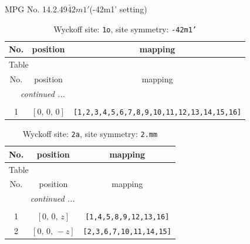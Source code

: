 \documentclass[fleqn,8pt]{jsarticle}
\begin{document}
\setcounter{MaxMatrixCols}{32}

\renewcommand{\tablename}{Table~}
\renewcommand{\figurename}{Figure~}
\begin{center}
\LARGE
MPG No. 14.2.49\quad$\bar{4}2m1'$\quad(-42m1' setting)
\end{center}
\renewcommand{\arraystretch}{1.2}
\begin{longtable}{ccc}
\caption{Wyckoff site: {\tt 1o}, site symmetry: {\tt -42m1'}}
 \\
 \hline \hline
No. & position & mapping \\ \hline \endfirsthead

\multicolumn{2}{l}{\tablename\ \thetable{}} \\
 \hline \hline
No. & position & mapping \\ \hline \endhead

 \hline \hline
\multicolumn{2}{r}{\footnotesize\it continued ...} \\ \endfoot

 \hline \hline
\multicolumn{2}{r}{} \\ \endlastfoot

1 & $\left[ 0,\, 0,\, 0 \right]$ & {\tt [1,2,3,4,5,6,7,8,9,10,11,12,13,14,15,16]} \\
\end{longtable}
\renewcommand{\arraystretch}{1.2}
\begin{longtable}{ccc}
\caption{Wyckoff site: {\tt 2a}, site symmetry: {\tt 2.mm}}
 \\
 \hline \hline
No. & position & mapping \\ \hline \endfirsthead

\multicolumn{2}{l}{\tablename\ \thetable{}} \\
 \hline \hline
No. & position & mapping \\ \hline \endhead

 \hline \hline
\multicolumn{2}{r}{\footnotesize\it continued ...} \\ \endfoot

 \hline \hline
\multicolumn{2}{r}{} \\ \endlastfoot

1 & $\left[ 0,\, 0,\, z \right]$ & {\tt [1,4,5,8,9,12,13,16]} \\ \hline
2 & $\left[ 0,\, 0,\, - z \right]$ & {\tt [2,3,6,7,10,11,14,15]} \\
\end{longtable}
\renewcommand{\arraystretch}{1.2}
\end{document}
